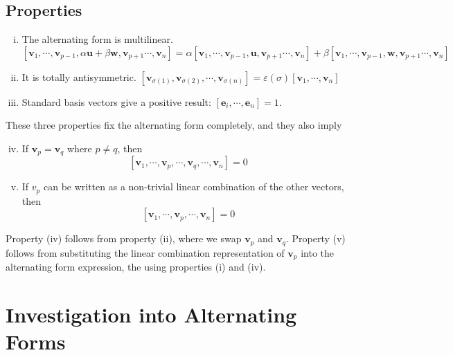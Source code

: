 \documentclass{article}
\begin{document}
	\subsection{Properties}
	\begin{enumerate}[(i)]
		\item The alternating form is multilinear.
		\[ [ \bm v_1, \cdots, \bm v_{p-1}, \alpha \bm u + \beta \bm w, \bm v_{p+1} \cdots, \bm v_n ] = \alpha [ \bm v_1, \cdots, \bm v_{p-1}, \bm u, \bm v_{p+1} \cdots, \bm v_n ] + \beta [ \bm v_1, \cdots, \bm v_{p-1}, \bm w, \bm v_{p+1} \cdots, \bm v_n ] \]
		\item It is totally antisymmetric. $[ \bm v_{\sigma(1)}, \bm v_{\sigma(2)}, \cdots, \bm v_{\sigma(n)} ] = \varepsilon(\sigma) [ \bm v_1, \cdots, \bm v_n ]$
		\item Standard basis vectors give a positive result: $[\bm e_i, \cdots, \bm e_n] = 1$.
	\end{enumerate}
	These three properties fix the alternating form completely, and they also imply
	\begin{enumerate}[(i)]
		\setcounter{enumi}{3}
		\item If $\bm v_p = \bm v_q$ where $p \neq q$, then
		\[ [\bm v_1, \cdots, \bm v_p, \cdots, \bm v_q, \cdots, \bm v_n ] = 0 \]
		\item If $v_p$ can be written as a non-trivial linear combination of the other vectors, then
		\[ [\bm v_1, \cdots, \bm v_p, \cdots, \bm v_n ] = 0 \]
	\end{enumerate}
	Property (iv) follows from property (ii), where we swap $\bm v_p$ and $\bm v_q$. Property (v) follows from substituting the linear combination representation of $\bm v_p$ into the alternating form expression, the using properties (i) and (iv).

	\section{Investigation into Alternating Forms}
\end{document}
